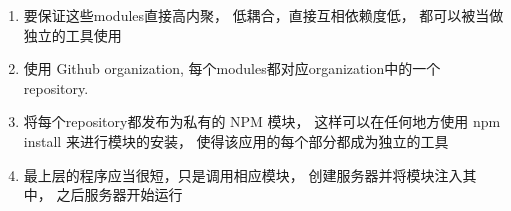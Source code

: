 \begin{enumerate}
	\item 要保证这些modules直接高内聚， 低耦合，直接互相依赖度低， 都可以被当做独立的工具使用
	\item 使用 Github organization, 每个modules都对应organization中的一个 repository. 
	\item 将每个repository都发布为私有的 NPM 模块， 这样可以在任何地方使用 npm install 来进行模块的安装， 使得该应用的每个部分都成为独立的工具
	
	\item 最上层的程序应当很短，只是调用相应模块， 创建服务器并将模块注入其中， 之后服务器开始运行
	
\end{enumerate}













